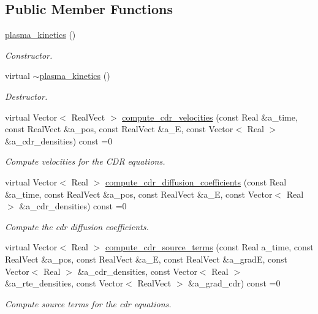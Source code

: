 \subsection*{Public Member Functions}
\begin{DoxyCompactItemize}
\item 
\hyperlink{classplasma__kinetics_a888f537f3b593623c9528f49a613beed}{plasma\+\_\+kinetics} ()
\begin{DoxyCompactList}\small\item\em Constructor. \end{DoxyCompactList}\item 
virtual \hyperlink{classplasma__kinetics_a0a8fde405561b4dc6e9aa744b2476b23}{$\sim$plasma\+\_\+kinetics} ()
\begin{DoxyCompactList}\small\item\em Destructor. \end{DoxyCompactList}\item 
virtual Vector$<$ Real\+Vect $>$ \hyperlink{classplasma__kinetics_ab7bc1ed1c41c1a686f2ef013936c68ea}{compute\+\_\+cdr\+\_\+velocities} (const Real \&a\+\_\+time, const Real\+Vect \&a\+\_\+pos, const Real\+Vect \&a\+\_\+E, const Vector$<$ Real $>$ \&a\+\_\+cdr\+\_\+densities) const =0
\begin{DoxyCompactList}\small\item\em Compute velocities for the C\+DR equations. \end{DoxyCompactList}\item 
virtual Vector$<$ Real $>$ \hyperlink{classplasma__kinetics_aabdbeb01a4b0be0100401744c029ace6}{compute\+\_\+cdr\+\_\+diffusion\+\_\+coefficients} (const Real \&a\+\_\+time, const Real\+Vect \&a\+\_\+pos, const Real\+Vect \&a\+\_\+E, const Vector$<$ Real $>$ \&a\+\_\+cdr\+\_\+densities) const =0
\begin{DoxyCompactList}\small\item\em Compute the cdr diffusion coefficients. \end{DoxyCompactList}\item 
virtual Vector$<$ Real $>$ \hyperlink{classplasma__kinetics_ab4a6a2327326dfdc260476ca8ee2195c}{compute\+\_\+cdr\+\_\+source\+\_\+terms} (const Real a\+\_\+time, const Real\+Vect \&a\+\_\+pos, const Real\+Vect \&a\+\_\+E, const Real\+Vect \&a\+\_\+gradE, const Vector$<$ Real $>$ \&a\+\_\+cdr\+\_\+densities, const Vector$<$ Real $>$ \&a\+\_\+rte\+\_\+densities, const Vector$<$ Real\+Vect $>$ \&a\+\_\+grad\+\_\+cdr) const =0
\begin{DoxyCompactList}\small\item\em Compute source terms for the cdr equations. \end{DoxyCompactList}\item 

\end{DoxyCompactItemize}
